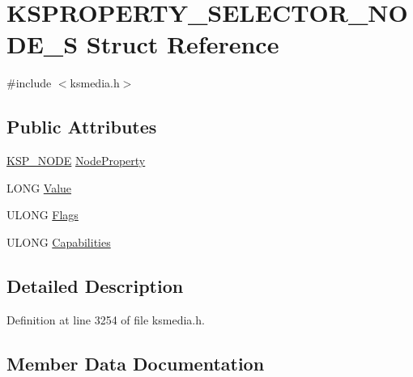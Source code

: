 \hypertarget{struct_k_s_p_r_o_p_e_r_t_y___s_e_l_e_c_t_o_r___n_o_d_e___s}{}\section{K\+S\+P\+R\+O\+P\+E\+R\+T\+Y\+\_\+\+S\+E\+L\+E\+C\+T\+O\+R\+\_\+\+N\+O\+D\+E\+\_\+S Struct Reference}
\label{struct_k_s_p_r_o_p_e_r_t_y___s_e_l_e_c_t_o_r___n_o_d_e___s}


{\ttfamily \#include $<$ksmedia.\+h$>$}

\subsection*{Public Attributes}
\begin{DoxyCompactItemize}
\item 
\hyperlink{struct_k_s_p___n_o_d_e}{K\+S\+P\+\_\+\+N\+O\+DE} \hyperlink{struct_k_s_p_r_o_p_e_r_t_y___s_e_l_e_c_t_o_r___n_o_d_e___s_a7085b678e1cf47167124c3824cb311c6}{Node\+Property}
\item 
L\+O\+NG \hyperlink{struct_k_s_p_r_o_p_e_r_t_y___s_e_l_e_c_t_o_r___n_o_d_e___s_ac1c76738a218e1b2be36fa55fe676827}{Value}
\item 
U\+L\+O\+NG \hyperlink{struct_k_s_p_r_o_p_e_r_t_y___s_e_l_e_c_t_o_r___n_o_d_e___s_a269a690f1564bf0cb333ae4ae4221dbc}{Flags}
\item 
U\+L\+O\+NG \hyperlink{struct_k_s_p_r_o_p_e_r_t_y___s_e_l_e_c_t_o_r___n_o_d_e___s_aaf1f682ce4a8e157a64a81cbde0365b6}{Capabilities}
\end{DoxyCompactItemize}


\subsection{Detailed Description}


Definition at line 3254 of file ksmedia.\+h.



\subsection{Member Data Documentation}
